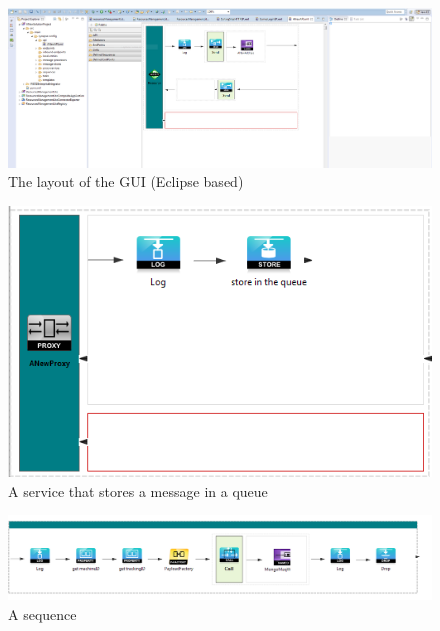 \documentclass[12pt,a4paper,twoside]{article}
\begin{document}
\begin{figure}[H]
\centering
\includegraphics[width=\textwidth]{ESB1.PNG}
\caption{\label{Tooling1}The layout of the GUI (Eclipse based)}
\end{figure}
\begin{figure}[H]
	\centering
	\includegraphics[width=\textwidth]{ESB2.PNG}
	\caption{\label{Tooling2}A service that stores a message in a queue}
\end{figure}
\begin{figure}[H]
	\centering
	\includegraphics[width=\textwidth]{ESB3.PNG}
	\caption{\label{Tooling3}A sequence}
\end{figure}
\end{document}
